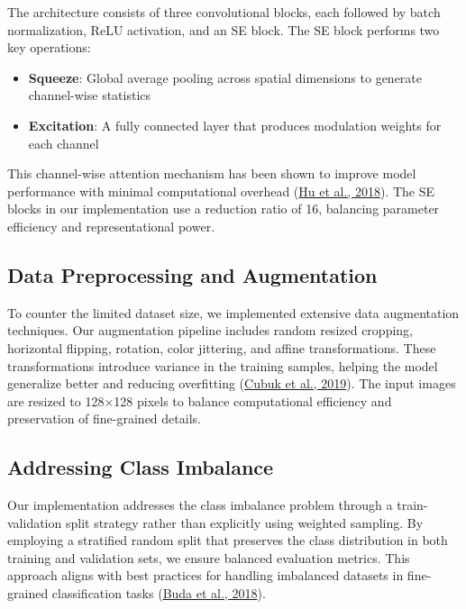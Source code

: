 \documentclass[a4paper,12pt]{article}
\begin{document}
The architecture consists of three convolutional blocks, each followed by batch normalization, ReLU activation, and an SE block. The SE block performs two key operations:
\begin{itemize}
    \item \textbf{Squeeze}: Global average pooling across spatial dimensions to generate channel-wise statistics
    \item \textbf{Excitation}: A fully connected layer that produces modulation weights for each channel
\end{itemize}

This channel-wise attention mechanism has been shown to improve model performance with minimal computational overhead (\href{https://openaccess.thecvf.com/content_cvpr_2018/papers/Hu_Squeeze-and-Excitation_Networks_CVPR_2018_paper.pdf}{Hu et al., 2018}). The SE blocks in our implementation use a reduction ratio of 16, balancing parameter efficiency and representational power.

\subsection{Data Preprocessing and Augmentation}

To counter the limited dataset size, we implemented extensive data augmentation techniques. Our augmentation pipeline includes random resized cropping, horizontal flipping, rotation, color jittering, and affine transformations. These transformations introduce variance in the training samples, helping the model generalize better and reducing overfitting (\href{https://arxiv.org/abs/1712.04621}{Cubuk et al., 2019}). The input images are resized to 128×128 pixels to balance computational efficiency and preservation of fine-grained details.

\subsection{Addressing Class Imbalance}

Our implementation addresses the class imbalance problem through a train-validation split strategy rather than explicitly using weighted sampling. By employing a stratified random split that preserves the class distribution in both training and validation sets, we ensure balanced evaluation metrics. This approach aligns with best practices for handling imbalanced datasets in fine-grained classification tasks (\href{https://arxiv.org/abs/1710.05381}{Buda et al., 2018}).
\end{document}
